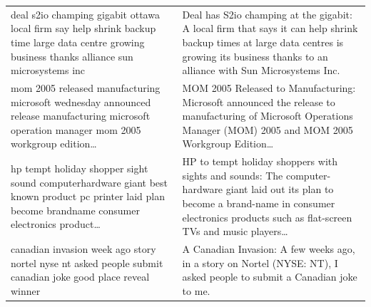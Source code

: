 \begin{table}[htbp]
\begin{tabular}{p{0.6\textheight} p{0.6\textheight}}
\addlinespace
deal s2io champing gigabit ottawa local firm say help shrink backup time large data centre growing business thanks alliance sun microsystems inc &
Deal has S2io champing at the gigabit: A local firm that says it can help shrink backup times at large data centres is growing its business thanks to an alliance with Sun Microsystems Inc. \\
\addlinespace
mom 2005 released manufacturing microsoft wednesday announced release manufacturing microsoft operation manager mom 2005 workgroup edition\ldots &
MOM 2005 Released to Manufacturing: Microsoft announced the release to manufacturing of Microsoft Operations Manager (MOM) 2005 and MOM 2005 Workgroup Edition\ldots \\
\addlinespace
hp tempt holiday shopper sight sound computerhardware giant best known product pc printer laid plan become brandname consumer electronics product\ldots &
HP to tempt holiday shoppers with sights and sounds: The computer-hardware giant laid out its plan to become a brand-name in consumer electronics products such as flat-screen TVs and music players\ldots \\
\addlinespace
canadian invasion week ago story nortel nyse nt asked people submit canadian joke good place reveal winner &
A Canadian Invasion: A few weeks ago, in a story on Nortel (NYSE: NT), I asked people to submit a Canadian joke to me. \\
\bottomrule
\end{tabular}
\end{table}